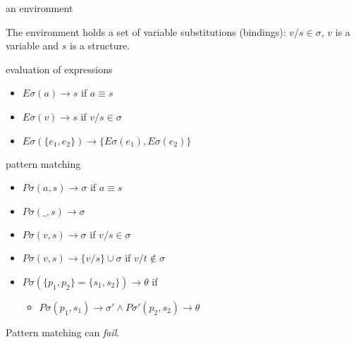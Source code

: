 \begin{frame}{an environment}

\pause\vspace{20pt}
The environment holds a set of variable substitutions (bindings):
$v/s \in \sigma$, $v$ is a variable and $s$ is a structure.


\end{frame}


\begin{frame}{evaluation of expressions}

 \begin{itemize}
   \pause \item $E\sigma(a) \rightarrow s$ if $a \equiv s$

   \pause \item $E\sigma(v) \rightarrow s$ if $v/s \in \sigma$

   \pause \item $E\sigma(\lbrace e_1 , e_2\rbrace) \rightarrow \lbrace E\sigma(e_1), E\sigma(e_2) \rbrace$

 \end{itemize}

\pause\vspace{20pt}{\em Evaluation can result in $\perp$, if a variable is unbound.}

\end{frame}


\begin{frame}{pattern matching}

\begin{itemize}
  \pause \item $P\sigma(a, s) \rightarrow \sigma$  if  $a \equiv s$
  \pause \item $P\sigma(\_,s) \rightarrow \sigma$  
  \pause \item $P\sigma(v, s) \rightarrow \sigma$  if \pause $ v/s \in \sigma $
  \pause \item $P\sigma(v, s) \rightarrow \lbrace v/s \rbrace \cup \sigma$ if \pause $ v/t \not\in \sigma$
   \pause \item $P\sigma(\lbrace p_1, p_2 \rbrace  = \lbrace s_1, s_2 \rbrace) \rightarrow \theta$ if
   \begin{itemize}
     \pause \item  $P\sigma(p_1, s_1) \rightarrow \sigma' \wedge P\sigma'(p_2, s_2) \rightarrow \theta$
   \end{itemize}

\end{itemize}

\pause\vspace{20pt}
Pattern matching can {\em fail}. 

\end{frame}

